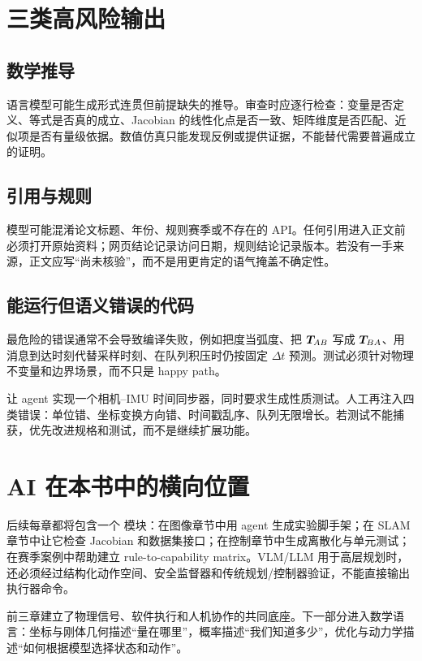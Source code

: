 \section{三类高风险输出}

\subsection{数学推导}

语言模型可能生成形式连贯但前提缺失的推导。审查时应逐行检查：变量是否定义、等式是否真的成立、Jacobian 的线性化点是否一致、矩阵维度是否匹配、近似项是否有量级依据。数值仿真只能发现反例或提供证据，不能替代需要普遍成立的证明。

\subsection{引用与规则}

模型可能混淆论文标题、年份、规则赛季或不存在的 API。任何引用进入正文前必须打开原始资料；网页结论记录访问日期，规则结论记录版本。若没有一手来源，正文应写“尚未核验”，而不是用更肯定的语气掩盖不确定性。

\subsection{能运行但语义错误的代码}

最危险的错误通常不会导致编译失败，例如把度当弧度、把 $\bm{T}_{AB}$ 写成 $\bm{T}_{BA}$、用消息到达时刻代替采样时刻、在队列积压时仍按固定 $\Delta t$ 预测。测试必须针对物理不变量和边界场景，而不只是 happy path。

\begin{aiverify}
让 agent 实现一个相机--IMU 时间同步器，同时要求生成性质测试。人工再注入四类错误：单位错、坐标变换方向错、时间戳乱序、队列无限增长。若测试不能捕获，优先改进规格和测试，而不是继续扩展功能。
\end{aiverify}

\section{AI 在本书中的横向位置}

后续每章都将包含一个  模块：在图像章节中用 agent 生成实验脚手架；在 SLAM 章节中让它检查 Jacobian 和数据集接口；在控制章节中生成离散化与单元测试；在赛季案例中帮助建立 rule-to-capability matrix。VLM/LLM 用于高层规划时，还必须经过结构化动作空间、安全监督器和传统规划/控制器验证，不能直接输出执行器命令。

\begin{chaptertransition}
前三章建立了物理信号、软件执行和人机协作的共同底座。下一部分进入数学语言：坐标与刚体几何描述“量在哪里”，概率描述“我们知道多少”，优化与动力学描述“如何根据模型选择状态和动作”。
\end{chaptertransition}

